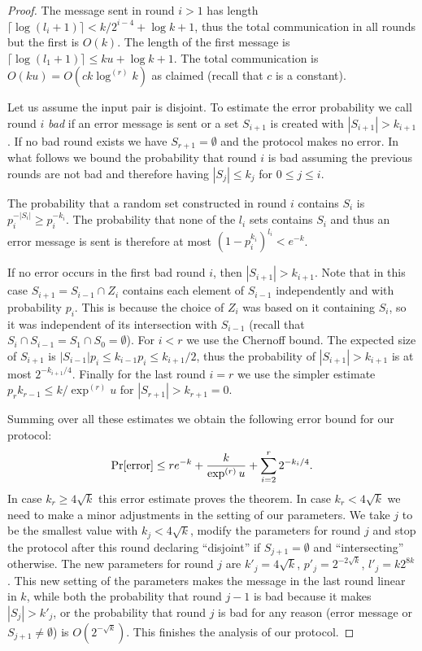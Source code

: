 \begin{proof}
The message sent in round $i>1$ has length
$\lceil\log(l_i+1)\rceil<k/2^{i-4}+\log k+1$, thus the total
communication in all rounds but the first is $O(k)$. The length
of the first message is $\lceil\log(l_1+1)\rceil\le ku+\log
k+1$. The total communication is $O(ku)=O(ck\log^{(r)}k)$ as
claimed (recall that $c$ is a constant).

Let us assume the input pair is disjoint. To estimate the error
probability we call round $i$ {\em bad} if an error message is
sent or a set $S_{i+1}$ is created with $|S_{i+1}|>k_{i+1}$. If
no bad round exists we have $S_{r+1}=\emptyset$ and the protocol
makes no error. In what follows we bound the probability that
round $i$ is bad assuming the previous rounds are not bad and
therefore having $|S_j|\le k_j$ for $0\le j\le i$.

The probability that a random set constructed in round $i$
contains $S_i$ is $p_i^{-|S_i|}\ge p_i^{-k_i}$. The probability
that none of the $l_i$ sets contains $S_i$ and thus an error
message is sent is therefore at most
$(1-p_i^{k_i})^{l_i}<e^{-k}$.

If no error occurs in the first bad round $i$, then
$|S_{i+1}|>k_{i+1}$. Note that in this case $S_{i+1}=S_{i-1}\cap
Z_i$ contains each element of $S_{i-1}$ independently and with
probability $p_i$. This is because the choice of $Z_i$ was based
on it containing $S_i$, so it was independent of its
intersection with $S_{i-1}$ (recall that $S_i\cap
S_{i-1}=S_1\cap S_0=\emptyset$). For $i<r$ we use the Chernoff
bound. The expected size of $S_{i+1}$ is $|S_{i-1}|p_i\le
k_{i-1}p_i\le k_{i+1}/2$, thus the probability of
$|S_{i+1}|>k_{i+1}$ is at most $2^{-k_{i+1}/4}$. Finally for the
last round $i=r$ we use the simpler estimate $p_rk_{r-1}\le
k/\exp^{(r)}u$ for $|S_{r+1}|>k_{r+1}=0$.

Summing over all these estimates we obtain the following error
bound for our protocol:
$$\Pr[\hbox{error}]\le re^{-k}+\frac k{\exp^{(r)}u}+
\sum_{i=2}^r2^{-k_i/4}.$$
In case $k_r\ge4\sqrt k$ this error estimate proves the theorem.
In case $k_r<4\sqrt k$ we need to make a minor adjustments in
the setting of our parameters. We take $j$ to be the smallest
value with $k_j<4\sqrt k$, modify the parameters for round $j$
and stop the protocol after this round declaring ``disjoint'' if
$S_{j+1}=\emptyset$ and ``intersecting'' otherwise. The new
parameters for round $j$ are $k'_j=4\sqrt k$, $p'_j=2^{-2\sqrt
k}$, $l'_j=k2^{8k}$. This new setting of the parameters makes
the message in the last round linear in $k$, while both the
probability that round $j-1$ is bad because it makes
$|S_j|>k'_j$, or the probability that round $j$ is bad for any
reason (error message or $S_{j+1}\ne\emptyset$) is $O(2^{-\sqrt
k})$. This finishes the analysis of our protocol.
\end{proof}
